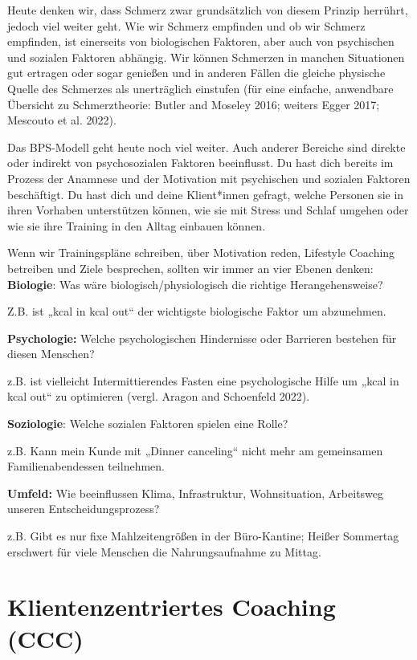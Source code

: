 \documentclass[
  letterpaper,
  DIV=11,
  numbers=noendperiod]{scrreprt}
\begin{document}
Heute denken wir, dass Schmerz zwar grundsätzlich von diesem Prinzip
herrührt, jedoch viel weiter geht. Wie wir Schmerz empfinden und ob wir
Schmerz empfinden, ist einerseits von biologischen Faktoren, aber auch
von psychischen und sozialen Faktoren abhängig. Wir können Schmerzen in
manchen Situationen gut ertragen oder sogar genießen und in anderen
Fällen die gleiche physische Quelle des Schmerzes als unerträglich
einstufen (für eine einfache, anwendbare Übersicht zu Schmerztheorie:
Butler and Moseley 2016; weiters Egger 2017; Mescouto et al. 2022).

Das BPS-Modell geht heute noch viel weiter. Auch anderer Bereiche sind
direkte oder indirekt von psychosozialen Faktoren beeinflusst. Du hast
dich bereits im Prozess der Anamnese und der Motivation mit psychischen
und sozialen Faktoren beschäftigt. Du hast dich und deine Klient*innen
gefragt, welche Personen sie in ihren Vorhaben unterstützen können, wie
sie mit Stress und Schlaf umgehen oder wie sie ihre Training in den
Alltag einbauen können.

Wenn wir Trainingspläne schreiben, über Motivation reden, Lifestyle
Coaching betreiben und Ziele besprechen, sollten wir immer an vier
Ebenen denken:\\
\textbf{Biologie}: Was wäre biologisch/physiologisch die richtige
Herangehensweise?

Z.B. ist „kcal in kcal out`` der wichtigste biologische Faktor um
abzunehmen.

\textbf{Psychologie:} Welche psychologischen Hindernisse oder Barrieren
bestehen für diesen Menschen?

z.B. ist vielleicht Intermittierendes Fasten eine psychologische Hilfe
um „kcal in kcal out`` zu optimieren (vergl. Aragon and Schoenfeld
2022).

\textbf{Soziologie}: Welche sozialen Faktoren spielen eine Rolle?

z.B. Kann mein Kunde mit „Dinner canceling`` nicht mehr am gemeinsamen
Familienabendessen teilnehmen.

\textbf{Umfeld:} Wie beeinflussen Klima, Infrastruktur, Wohnsituation,
Arbeitsweg unseren Entscheidungsprozess?

z.B. Gibt es nur fixe Mahlzeitengrößen in der Büro-Kantine; Heißer
Sommertag erschwert für viele Menschen die Nahrungsaufnahme zu Mittag.

\section{Klientenzentriertes Coaching
(CCC)}\label{klientenzentriertes-coaching-ccc}
\end{document}
